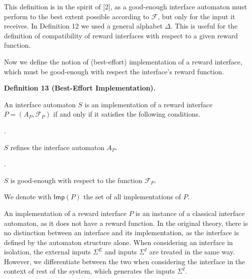 \documentclass[10pt,a4paper]{article}
\begin{document}
 
 
 
This definition is in the spirit of [2], as a good-enough interface automaton must perform to the best extent possible according to $\mathcal{F}$, but only for the input it receives. In Definition 12 we used a general alphabet $\Delta$. This is useful for the definition of compatibility of reward interfaces with respect to a given reward function.\par
 
 
 
Now we define the notion of (best-effort) implementation of a reward interface, which must be good-enough with respect the interface’s reward function.\par
 
 
 
\par\medskip\noindent\textbf{Definition 13 (Best-Effort Implementation).}\par
 
 
An interface automaton $S$ is an implementation of a reward interface $P=(A_{P},\mathcal{F}_{P})$ if and only if it satisfies the following conditions.\par
  
\par{}. 
 
$S$ refines the interface automaton $A_{P}$.\par
 
 
 
\par{}. 
 
$S$ is good-enough with respect to the function $\mathcal{F}_{P}$.\par
 
 
  
We denote with $\mathsf{Imp}(P)$ the set of all implementations of $P$.\par
 
 
 
 
An implementation of a reward interface $P$ is an instance of a classical interface automaton, as it does not have a reward function. In the original theory, there is no distinction between an interface and its implementation, as the interface is defined by the automaton structure alone. When considering an interface in isolation, the external inputs $\Sigma^{E}$ and inputs $\Sigma^{I}$ are treated in the same way. However, we differentiate between the two when considering the interface in the context of rest of the system, which generates the inputs $\Sigma^{I}$.\par
 
\end{document}
